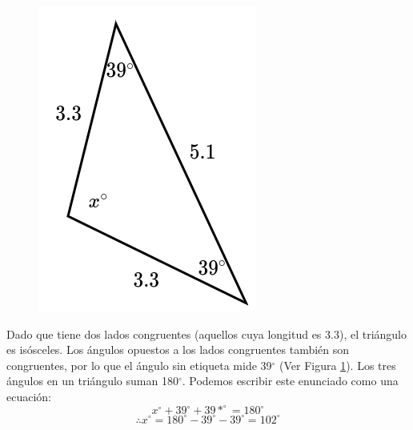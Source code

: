 \begin{minipage}[t][][t]{0.6\textwidth}
    \begin{solutionbox}{8cm}
        \begin{minipage}{0.3\textwidth}
            \begin{figure}[H]
                \centering
                \includegraphics[width=0.9\linewidth]{../images/findangle07a.png}
                \caption{}
                \label{fig:findangle07a}
            \end{figure}
        \end{minipage}\hfill
        \begin{minipage}{0.65\textwidth}
            Dado que tiene dos lados congruentes (aquellos cuya longitud es 3.3), el triángulo es isósceles. Los ángulos opuestos a los lados congruentes también son congruentes, por lo que el ángulo sin etiqueta mide 39$^\circ$ (Ver Figura \ref{fig:findangle07a}).
            Los tres ángulos en un triángulo suman 180$^\circ$. Podemos escribir este enunciado como una ecuación:
            \[x^\circ + 39^\circ + 39*^\circ = 180^\circ \]
            \[\therefore x^\circ = 180^\circ - 39^\circ - 39^\circ = 102^\circ\]
        \end{minipage}
    \end{solutionbox}
\end{minipage}